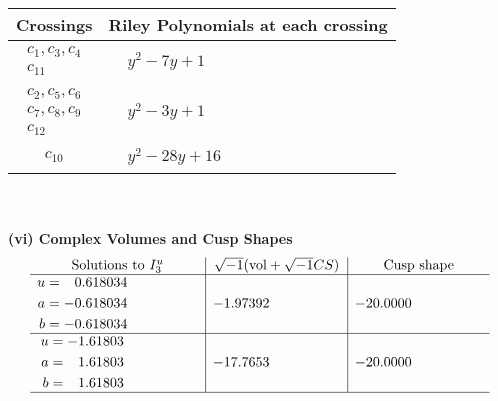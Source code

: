 \documentclass[1p]{elsarticle_modified}
\theoremstyle{definition}
\newcommand{\I}{\sqrt{-1}}
\begin{document}
\begin{tabular}{m{50pt}|m{274pt}}
Crossings & \hspace{64pt}Riley Polynomials at each crossing \\
\hline $$\begin{aligned}c_{1},c_{3},c_{4}\\c_{11}\end{aligned}$$&$\begin{aligned}
&y^2-7 y+1
\end{aligned}$\\
\hline $$\begin{aligned}c_{2},c_{5},c_{6}\\c_{7},c_{8},c_{9}\\c_{12}\end{aligned}$$&$\begin{aligned}
&y^2-3 y+1
\end{aligned}$\\
\hline $$\begin{aligned}c_{10}\end{aligned}$$&$\begin{aligned}
&y^2-28 y+16
\end{aligned}$\\
\hline
\end{tabular}\\~\\
\newpage\flushleft \textbf{(vi) Complex Volumes and Cusp Shapes}
$$\begin{array}{c|c|c}  
\text{Solutions to }I^u_{3}& \I (\text{vol} + \sqrt{-1}CS) & \text{Cusp shape}\\
 \hline 
\begin{aligned}
u &= \phantom{-}0.618034\phantom{ +0.000000I} \\
a &= -0.618034\phantom{ +0.000000I} \\
b &= -0.618034\phantom{ +0.000000I}\end{aligned}
 & -1.97392\phantom{ +0.000000I} & -20.0000\phantom{ +0.000000I} \\ \hline\begin{aligned}
u &= -1.61803\phantom{ +0.000000I} \\
a &= \phantom{-}1.61803\phantom{ +0.000000I} \\
b &= \phantom{-}1.61803\phantom{ +0.000000I}\end{aligned}
 & -17.7653\phantom{ +0.000000I} & -20.0000\phantom{ +0.000000I}\\
 \hline 
 \end{array}$$\newpage\newpage\renewcommand{\arraystretch}{1}
\end{document}

